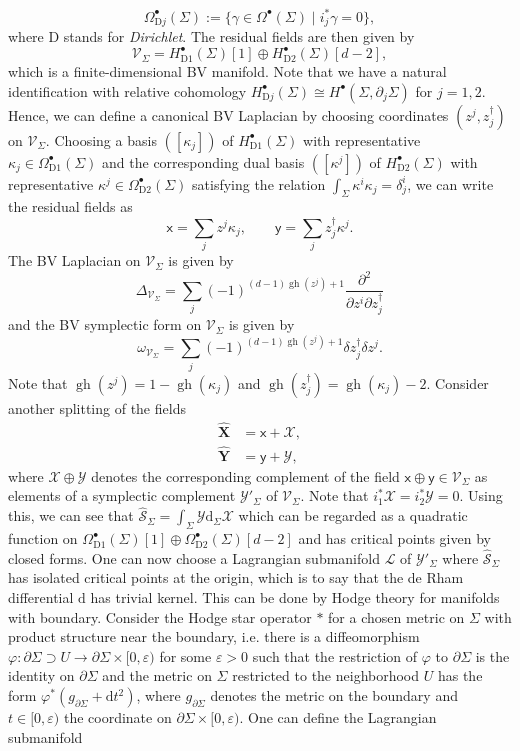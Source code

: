 \documentclass[11pt,colorinlistoftodos]{amsart}
\numberwithin{equation}{subsection}
\theoremstyle{plain}
\theoremstyle{definition}
\theoremstyle{remark}
\newcommand{\calY}{\mathcal{Y}}
\newcommand{\dd}{{\mathrm{d}}}
\DeclareMathOperator{\gh}{gh}
\newcommand{\de}{\partial}
\newcommand{\calS}{\mathcal{S}}
\newcommand{\calL}{\mathcal{L}}
\newcommand{\calV}{\mathcal{V}}
\begin{document}
\[
\Omega^\bullet_{\mathrm{D}j}(\Sigma):=\{\gamma\in\Omega^\bullet(\Sigma)\mid i^*_j\gamma=0\},
\]
where D stands for \emph{Dirichlet}. The residual fields are then given by
\[
\calV_\Sigma=H^\bullet_{\mathrm{D}1}(\Sigma)[1]\oplus H^\bullet_{\mathrm{D}2}(\Sigma)[d-2],
\]
which is a finite-dimensional BV manifold. Note that we have a natural identification with relative cohomology $H^\bullet_{\mathrm{D}j}(\Sigma)\cong H^\bullet(\Sigma,\de_j\Sigma)$ for $j=1,2$.
Hence, we can define a canonical BV Laplacian by choosing coordinates $(z^j,z^\dagger_j)$ on $\calV_\Sigma$. Choosing a basis $([\kappa_j])$ of $H^\bullet_{\mathrm{D}1}(\Sigma)$ with representative $\kappa_j\in \Omega^\bullet_{\mathrm{D}1}(\Sigma)$ and the corresponding dual basis $([\kappa^j])$ of $H^\bullet_{\mathrm{D}2}(\Sigma)$ with representative $\kappa^j\in \Omega^\bullet_{\mathrm{D}2}(\Sigma)$ satisfying the relation $\int_\Sigma\kappa^i\kappa_j=\delta^i_j$, we can write the residual fields as 
\begin{equation}
    \mathsf{x}=\sum_jz^j\kappa_j,\qquad\mathsf{y}=\sum_jz^\dagger_j\kappa^j.
\end{equation}
The BV Laplacian on $\calV_\Sigma$ is given by
\[
\Delta_{\calV_\Sigma}=\sum_j(-1)^{(d-1)\gh(z^j)+1}\frac{\de^2}{\de z^i\de z^\dagger_j}
\]
and the BV symplectic form on $\calV_\Sigma$ is given by 
\[
\omega_{\calV_\Sigma}=\sum_j(-1)^{(d-1)\gh(z^j)+1}\delta z^\dagger_j\delta z^j.
\]
Note that $\gh(z^j)=1-\gh(\kappa_j)$ and $\gh(z^\dagger_j)=\gh(\kappa_j)-2$. Consider another splitting of the fields
\begin{align*}
    \widehat{\mathbf{X}}&=\mathsf{x}+\mathscr{X},\\
    \widehat{\mathbf{Y}}&=\mathsf{y}+\mathscr{Y},
\end{align*}
where $\mathscr{X}\oplus\mathscr{Y}$ denotes the corresponding complement of the field $\mathsf{x}\oplus \mathsf{y}\in \calV_\Sigma$ as elements of a symplectic complement $\calY'_\Sigma$ of $\calV_\Sigma$. Note that $i_1^*\mathscr{X}=i_2^*\mathscr{Y}=0$. Using this, we can see that $\widehat{\calS}_\Sigma=\int_\Sigma\mathscr{Y}\dd_\Sigma\mathscr{X}$ which can be regarded as a quadratic function on $\Omega^\bullet_{\mathrm{D}1}(\Sigma)[1]\oplus\Omega^\bullet_{\mathrm{D}2}(\Sigma)[d-2]$ and has critical points given by closed forms. One can now choose a Lagrangian submanifold $\calL$ of $\calY'_\Sigma$ where $\widehat{\calS}_\Sigma$ has isolated critical points at the origin, which is to say that the de Rham differential $\dd$ has trivial kernel. This can be done by Hodge theory for manifolds with boundary. Consider the Hodge star operator $*$ for a chosen metric on $\Sigma$ with product structure near the boundary, i.e. there is a diffeomorphism $\varphi\colon \de\Sigma\supset U\to \de\Sigma\times [0,\varepsilon)$ for some $\varepsilon>0$ such that the restriction of $\varphi$ to $\de\Sigma$ is the identity on $\de\Sigma$ and the metric on $\Sigma$ restricted to the neighborhood $U$ has the form $\varphi^*(g_{\de\Sigma}+\dd t^2)$, where $g_{\de\Sigma}$ denotes the metric on the boundary and $t\in[0,\varepsilon)$ the coordinate on $\de\Sigma\times [0,\varepsilon)$. One can define the Lagrangian submanifold 
\end{document}
